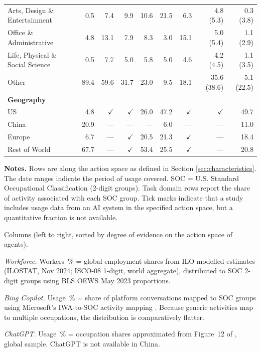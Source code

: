\documentclass[manuscript,screen,nonacm,oneside]{acmart}
\begin{document}
\begin{table}[htbp]
{\begin{tabular}{lrrrrrrrr}
Arts, Design \& Entertainment & 0.5 & 7.4 & 9.9 & 10.6 & 21.5 & 6.3 & 4.8 (5.3) & 0.3 (3.8) \\
Office \& Administrative & 4.8 & 13.1 & 7.9 & 8.3 & 3.0 & 15.1 & 5.0 (5.4) & 1.1 (2.9) \\
Life, Physical \& Social Science & 0.5 & 7.7 & 5.0 & 5.8 & 5.0 & 4.6 & 4.2 (4.5) & 1.1 (3.5) \\
Other & 89.4 & 59.6 & 31.7 & 23.0 & 9.5 & 18.1 & 35.6 (38.6) & 5.1 (22.5) \\
\midrule
\multicolumn{9}{l}{\textbf{Geography}} \\
US & 4.8 & $\checkmark$ & $\checkmark$ & 26.0 & 47.2 & $\checkmark$ & $\checkmark$ & 49.7 \\
China & 20.9 & --- & --- & --- & 6.0 & --- & --- & 11.0 \\
Europe & 6.7 & --- & $\checkmark$ & 20.5 & 21.3 & $\checkmark$ & --- & 18.4 \\
Rest of World & 67.7 & --- & $\checkmark$ & 53.4 & 25.5 & $\checkmark$ & --- & 20.8 \\
\bottomrule
\end{tabular}
}
\vspace{1mm}
\begin{minipage}{\linewidth}
\scriptsize
\textbf{Notes.} Rows are along the action space as defined in Section \ref{sec:characteristics}. The date ranges indicate the period of usage covered. SOC = U.S. Standard Occupational Classification (2-digit groups). Task domain rows report the share of activity associated with each SOC group. Tick marks indicate that a study includes usage data from an AI system in the specified action space, but a quantitative fraction is not available.

\medskip
Columns (left to right, sorted by degree of evidence on the action space of agents).

\textit{Workforce.} Workers~\% = global employment shares from ILO modelled estimates (ILOSTAT, Nov 2024; ISCO-08 1-digit, world aggregate), distributed to SOC 2-digit groups using BLS OEWS May 2023 proportions.

\textit{Bing Copilot.} Usage~\% = share of platform conversations mapped to SOC groups using Microsoft's IWA-to-SOC activity mapping \citep{yang2025adoption}. Because generic activities map to multiple occupations, the distribution is comparatively flatter.

\textit{ChatGPT.} Usage~\% = occupation shares approximated from Figure~12 of \citep{chatterji2025people}, global sample. ChatGPT is not available in China.


\end{minipage}
\end{table}
\end{document}
